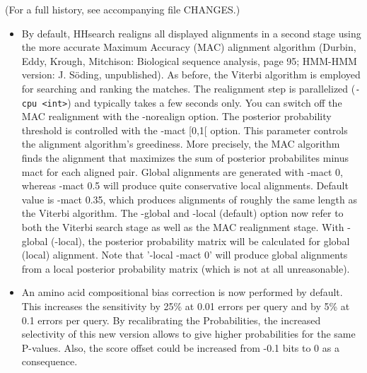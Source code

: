 \documentclass[11pt,a4paper]{article}
\begin{document}
(For a full history, see accompanying file CHANGES.)

\begin{itemize}
\item{By default, HHsearch realigns all displayed alignments in a second stage 
  using the more accurate Maximum Accuracy (MAC) alignment algorithm 
  (Durbin, Eddy, Krough, Mitchison: Biological sequence analysis, page 95;
  HMM-HMM version: J. S\"oding, unpublished). As before, the Viterbi algorithm 
  is employed for searching and ranking the matches. The realignment step is 
  parallelized (\verb`-cpu <int>`) and typically takes a few seconds only. You can 
  switch off the MAC realignment with the -norealign option. 
     The posterior probability threshold is controlled with the -mact [0,1[ 
  option. This parameter controls the alignment algorithm's greediness. More 
  precisely, the MAC algorithm finds the alignment that maximizes the sum of 
  posterior probabilites minus mact for each aligned pair. Global alignments 
  are generated with -mact 0, whereas -mact 0.5 will produce quite conservative
  local alignments. Default value is -mact 0.35, which produces alignments of
  roughly the same length as the Viterbi algorithm. 
     The -global and -local (default) option now refer to both the Viterbi search 
  stage as well as the MAC realignment stage. With -global (-local), the 
  posterior probability matrix will be calculated for global (local) 
  alignment. Note that '-local -mact 0' will produce global alignments from
  a local posterior probability matrix (which is not at all unreasonable).
}
\item{An amino acid compositional bias correction is now performed by default.
  This increases the sensitivity by 25\% at 0.01 errors per query and by 5\% at 
  0.1 errors per query. By recalibrating the Probabilities, the increased 
  selectivity of this new version allows to give higher probabilities for the 
  same P-values. Also, the score offset could be increased from -0.1 bits to 0 
  as a consequence. 
}


\end{itemize}
\end{document}

